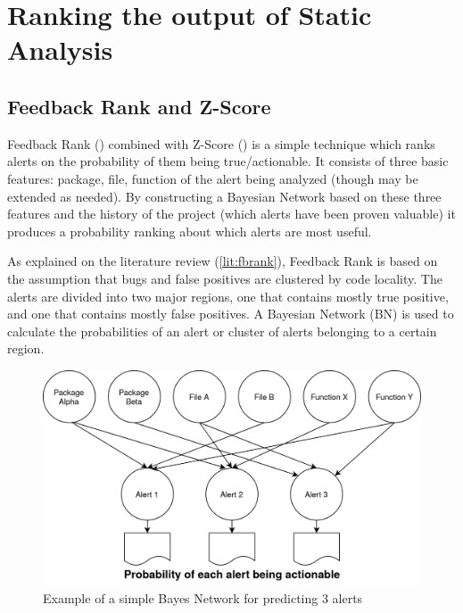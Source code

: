 
\section{Ranking the output of Static Analysis}\label{sec:ranking}



\subsection{Feedback Rank and Z-Score}


Feedback Rank (\cite{correlation_exploitation}) combined with Z-Score (\cite{z-ranking}) is a simple technique which ranks alerts on the probability of them being true/actionable. It consists of three basic features: package, file, function of the alert being analyzed (though may be extended as needed).
By constructing a Bayesian Network based on these three features and the history of the project (which alerts have been proven valuable) it produces a probability ranking about which alerts are most useful.

As explained on the literature review (\cref{lit:fbrank}), Feedback Rank is based on the assumption that bugs and false positives are clustered by code locality. The alerts are divided into two major regions, one that contains mostly true positive, and one that contains mostly false positives. A Bayesian Network (BN) is used to calculate the probabilities of an alert or cluster of alerts belonging to a certain region.

\begin{figure}[H]
	\centering
	\includegraphics[scale=0.2]{./src/bayes_example.png}
	\caption{Example of a simple Bayes Network for predicting 3 alerts}
\end{figure}

